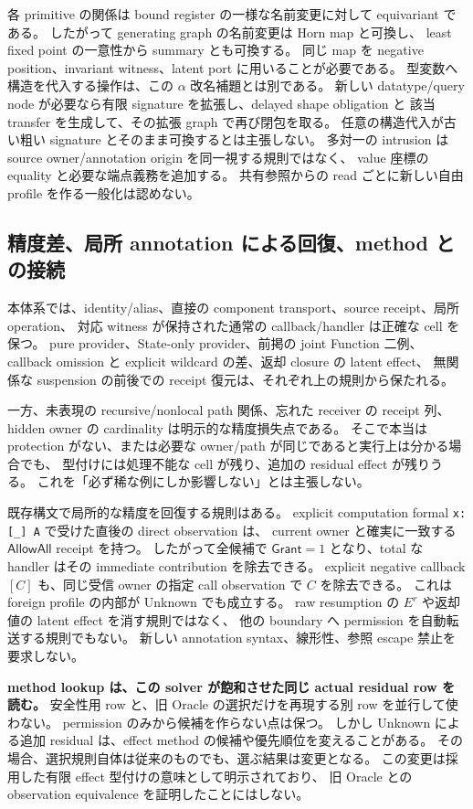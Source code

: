 \documentclass[11pt,a4paper]{article}
\theoremstyle{remark}
\begin{document}
各 primitive の関係は bound register の一様な名前変更に対して equivariant である。
したがって generating graph の名前変更は Horn map と可換し、
least fixed point の一意性から summary とも可換する。
同じ map を negative position、invariant witness、latent port に用いることが必要である。
型変数へ構造を代入する操作は、この $\alpha$ 改名補題とは別である。
新しい datatype/query node が必要なら有限 signature を拡張し、delayed shape obligation と
該当 transfer を生成して、その拡張 graph で再び閉包を取る。
任意の構造代入が古い粗い signature とそのまま可換するとは主張しない。
多対一の intrusion は source owner/annotation origin を同一視する規則ではなく、
value 座標の equality と必要な端点義務を追加する。
共有参照からの read ごとに新しい自由 profile を作る一般化は認めない。

\subsection{精度差、局所 annotation による回復、method との接続}

本体系では、identity/alias、直接の component transport、source receipt、局所 operation、
対応 witness が保持された通常の callback/handler は正確な cell を保つ。
pure provider、State-only provider、前掲の joint Function 二例、
callback omission と explicit wildcard の差、返却 closure の latent effect、
無関係な suspension の前後での receipt 復元は、それぞれ上の規則から保たれる。

一方、未表現の recursive/nonlocal path 関係、忘れた receiver の receipt 列、
hidden owner の cardinality は明示的な精度損失点である。
そこで本当は protection がない、または必要な owner/path が同じであると実行上は分かる場合でも、
型付けには処理不能な cell が残り、追加の residual effect が残りうる。
これを「必ず稀な例にしか影響しない」とは主張しない。

既存構文で局所的な精度を回復する規則はある。
explicit computation formal \texttt{x:[\_] A} で受けた直後の direct observation は、
current owner と確実に一致する $\mathsf{AllowAll}$ receipt を持つ。
したがって全候補で $\mathsf{Grant}=1$ となり、total な handler はその immediate contribution を除去できる。
explicit negative callback $[C]$ も、同じ受信 owner の指定 call observation で $C$ を除去できる。
これは foreign profile の内部が Unknown でも成立する。
raw resumption の $E^r$ や返却値の latent effect を消す規則ではなく、
他の boundary へ permission を自動転送する規則でもない。
新しい annotation syntax、線形性、参照 escape 禁止を要求しない。

\textbf{method lookup は、この solver が飽和させた同じ actual residual row を読む。}
安全性用 row と、旧 Oracle の選択だけを再現する別 row を並行して使わない。
permission のみから候補を作らない点は保つ。
しかし Unknown による追加 residual は、effect method の候補や優先順位を変えることがある。
その場合、選択規則自体は従来のものでも、選ぶ結果は変更となる。
この変更は採用した有限 effect 型付けの意味として明示されており、
旧 Oracle との observation equivalence を証明したことにはしない。
\end{document}
